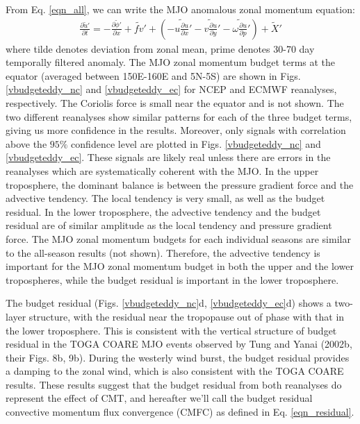 \documentclass[12pt]{article}
\begin{document}
  From Eq. \ref{eqn_all}, we can write the MJO anomalous zonal
momentum equation:
\begin{eqnarray}
\frac{\partial \widetilde{u} '}{\partial t} =
- \frac{\partial \widetilde{\phi} '}{\partial x}
+ \widetilde{fv}'
+ (- \widetilde{u \frac{\partial u}{\partial x}} '
- \widetilde{v \frac{\partial u}{\partial y}} '
- \widetilde{\omega \frac{\partial u}{\partial p}} ')
+ \widetilde{X} '
\label{eqn_mjo}
\end{eqnarray}
where tilde denotes deviation from zonal mean, prime denotes 
30-70 day temporally filtered anomaly.  The MJO zonal momentum budget
terms at the equator (averaged between 150E-160E and 5N-5S) are shown
in Figs. \ref{vbudgeteddy_nc} and \ref{vbudgeteddy_ec} for NCEP and ECMWF
reanalyses, respectively.  The Coriolis force is small near the
equator and is not shown.  The two different reanalyses show similar
patterns for each of the three budget terms, giving us more confidence
in the results.  Moreover, only signals with correlation above the
$95\%$ confidence level are plotted in Figs. \ref{vbudgeteddy_nc} and
\ref{vbudgeteddy_ec}.  These signals are likely real unless there are
errors in the reanalyses which are systematically coherent with the MJO.
In the upper troposphere, the dominant balance is between the
pressure gradient force and the advective tendency. The local
tendency is very small, as well as the budget residual.
In the lower troposphere, the advective tendency and the budget residual 
are of similar amplitude as the local tendency and pressure gradient force.
The MJO zonal momentum budgets for each individual seasons are similar
to the all-season results (not shown).
Therefore, the advective tendency is important for the MJO zonal momentum
budget in both the upper and the lower tropospheres, while the budget residual
is important in the lower troposphere.

The budget residual (Figs. \ref{vbudgeteddy_nc}d, \ref{vbudgeteddy_ec}d)
shows a two-layer structure, with the residual near the tropopause out of phase
with that in the lower troposphere.
This is consistent with the vertical structure of budget residual
in the TOGA COARE MJO events observed by 
Tung and Yanai (2002b, their Figs. 8b, 9b).
During the westerly wind burst, the budget residual provides a damping
to the zonal wind, which is also consistent with the TOGA COARE results.
These results suggest that the budget residual from both reanalyses 
do represent the effect of CMT, and hereafter we'll call the budget residual
convective momentum flux convergence (CMFC) 
as defined in Eq. \ref{eqn_residual}.
\end{document}
